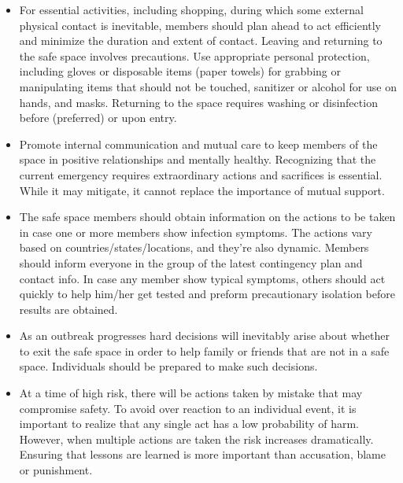 \documentclass[onecolumn,journal]{IEEEtran}
\begin{document}
\begin{multicols}{2}
\begin{itemize}
\item For essential activities, including shopping, during which some external physical contact is inevitable, members should plan ahead to act efficiently and minimize the duration and extent of contact. Leaving and returning to the safe space involves precautions. Use appropriate personal protection, including gloves or disposable items (paper towels) for grabbing or manipulating items that should not be touched, sanitizer or alcohol for use on hands, and masks. Returning to the space requires washing or disinfection before (preferred) or upon entry.

\item Promote internal communication and mutual care to keep members of the space in positive relationships and mentally healthy. Recognizing that the current emergency requires extraordinary actions and sacrifices is essential. While it may mitigate, it cannot replace the importance of mutual support.

\item The safe space members should obtain information on the actions to be taken in case one or more members show infection symptoms. The actions vary based on countries/states/locations, and they're also dynamic. Members should inform everyone in the group of the latest contingency plan and contact info. In case any member show typical symptoms, others should act quickly to help him/her get tested and preform precautionary isolation before results are obtained.

\item As an outbreak progresses hard decisions will inevitably arise about whether to exit the safe space in order to help family or friends that are not in a safe space. Individuals should be prepared to make such decisions. 

\item At a time of high risk, there will be actions taken by mistake that may compromise safety. To avoid over reaction to an individual event, it is important to realize that any single act has a low probability of harm. However, when multiple actions are taken the risk increases dramatically. Ensuring that lessons are learned is more important than accusation, blame or punishment. 


\end{itemize}

\end{multicols}
		

	
% 
\end{document}
